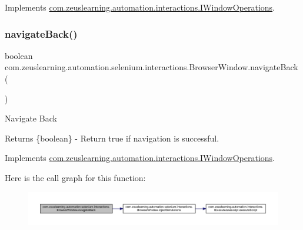 Implements \hyperlink{interfacecom_1_1zeuslearning_1_1automation_1_1interactions_1_1IWindowOperations_aafa2eefdac53d368d85e626d7d7901ea}{com.\+zeuslearning.\+automation.\+interactions.\+I\+Window\+Operations}.

\hypertarget{classcom_1_1zeuslearning_1_1automation_1_1selenium_1_1interactions_1_1BrowserWindow_ac680899d66b9d544bed94dc3de808559}{}\label{classcom_1_1zeuslearning_1_1automation_1_1selenium_1_1interactions_1_1BrowserWindow_ac680899d66b9d544bed94dc3de808559} 
\subsubsection{\texorpdfstring{navigate\+Back()}{navigateBack()}}
{\footnotesize\ttfamily boolean com.\+zeuslearning.\+automation.\+selenium.\+interactions.\+Browser\+Window.\+navigate\+Back (\begin{DoxyParamCaption}{ }\end{DoxyParamCaption})\hspace{0.3cm}{\ttfamily [inline]}}

Navigate Back

\begin{DoxyReturn}{Returns}
\{boolean\} -\/ Return {\ttfamily true} if navigation is successful. 
\end{DoxyReturn}


Implements \hyperlink{interfacecom_1_1zeuslearning_1_1automation_1_1interactions_1_1IWindowOperations_a609624cbf549bfa10a2fd9265f33ea61}{com.\+zeuslearning.\+automation.\+interactions.\+I\+Window\+Operations}.

Here is the call graph for this function\+:
\nopagebreak
\begin{figure}[H]
\begin{center}
\leavevmode
\includegraphics[width=350pt]{d8/d87/classcom_1_1zeuslearning_1_1automation_1_1selenium_1_1interactions_1_1BrowserWindow_ac680899d66b9d544bed94dc3de808559_cgraph}
\end{center}
\end{figure}
\hypertarget{classcom_1_1zeuslearning_1_1automation_1_1selenium_1_1interactions_1_1BrowserWindow_a0944339f910fc20bbb074e393270c9cc}{}\label{classcom_1_1zeuslearning_1_1automation_1_1selenium_1_1interactions_1_1BrowserWindow_a0944339f910fc20bbb074e393270c9cc} 
